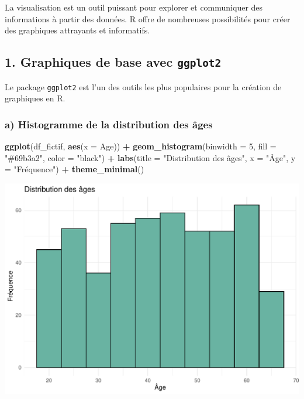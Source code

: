 \documentclass[
]{article}
\newenvironment{Shaded}{\begin{snugshade}}{\end{snugshade}}
\newcommand{\AttributeTok}[1]{\textcolor[rgb]{0.13,0.29,0.53}{#1}}
\newcommand{\DecValTok}[1]{\textcolor[rgb]{0.00,0.00,0.81}{#1}}
\newcommand{\FunctionTok}[1]{\textcolor[rgb]{0.13,0.29,0.53}{\textbf{#1}}}
\newcommand{\NormalTok}[1]{#1}
\newcommand{\SpecialCharTok}[1]{\textcolor[rgb]{0.81,0.36,0.00}{\textbf{#1}}}
\newcommand{\StringTok}[1]{\textcolor[rgb]{0.31,0.60,0.02}{#1}}
\begin{document}
La visualisation est un outil puissant pour explorer et communiquer des
informations à partir des données. R offre de nombreuses possibilités
pour créer des graphiques attrayants et informatifs.

\hypertarget{graphiques-de-base-avec-ggplot2}{%
\subsection{\texorpdfstring{1. Graphiques de base avec
\texttt{ggplot2}}{1. Graphiques de base avec ggplot2}}\label{graphiques-de-base-avec-ggplot2}}

Le package \texttt{ggplot2} est l'un des outils les plus populaires pour
la création de graphiques en R.

\hypertarget{a-histogramme-de-la-distribution-des-uxe2ges}{%
\subsubsection{a) Histogramme de la distribution des
âges}\label{a-histogramme-de-la-distribution-des-uxe2ges}}

\begin{Shaded}
\begin{Highlighting}[]
\FunctionTok{ggplot}\NormalTok{(df\_fictif, }\FunctionTok{aes}\NormalTok{(}\AttributeTok{x =}\NormalTok{ Age)) }\SpecialCharTok{+}
  \FunctionTok{geom\_histogram}\NormalTok{(}\AttributeTok{binwidth =} \DecValTok{5}\NormalTok{, }\AttributeTok{fill =} \StringTok{"\#69b3a2"}\NormalTok{, }\AttributeTok{color =} \StringTok{"black"}\NormalTok{) }\SpecialCharTok{+}
  \FunctionTok{labs}\NormalTok{(}\AttributeTok{title =} \StringTok{"Distribution des âges"}\NormalTok{, }\AttributeTok{x =} \StringTok{"Âge"}\NormalTok{, }\AttributeTok{y =} \StringTok{"Fréquence"}\NormalTok{) }\SpecialCharTok{+}
  \FunctionTok{theme\_minimal}\NormalTok{()}
\end{Highlighting}
\end{Shaded}

\includegraphics{TP_1_files/figure-latex/histogramme-age-1.pdf}
\end{document}
